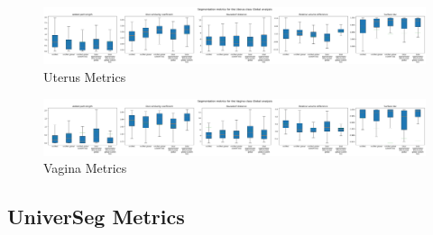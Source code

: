 \documentclass[11pt,twoside]{report}
\begin{document}
\begin{landscape}
  \begin{figure}[H]
    \centering
    \includegraphics[width=\linewidth]{../../research/source/code/data/metrics/metricsuterus_1_combinednotable_Global_analysis.png}
    \caption{Uterus Metrics}\label{fig:region-based-metrics-uterus}
  \end{figure}

  \begin{figure}[H]
    \centering
    \includegraphics[width=\linewidth]{../../research/source/code/data/metrics/metricsvagina_1_combinednotable_Global_analysis.png}
    \caption{Vagina Metrics}\label{fig:region-based-metrics-vagina}
  \end{figure}

\end{landscape}

\subsection{UniverSeg Metrics}\label{sect:universeg-appendix}
\end{document}
